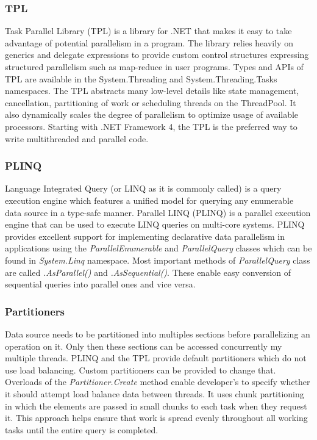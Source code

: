 \subsubsection{TPL}
\label{sec: TPL}
Task Parallel Library (TPL) is a library for .NET that
makes it easy to take advantage of potential parallelism in
a program. The library relies heavily on generics and delegate
expressions to provide custom control structures expressing
structured parallelism such as map-reduce in user
programs. Types and APIs of TPL are available in the System.Threading and System.Threading.Tasks namespaces.
The TPL abstracts many low-level details like state management, cancellation, partitioning of work or scheduling threads on the ThreadPool.
It also dynamically scales the degree of parallelism to optimize usage of available processors. Starting with .NET Framework 4, the TPL is the preferred way to write multithreaded and parallel code. \cite{Leijen2009}

\subsubsection{PLINQ}
\label{sec: PLINQ}
Language Integrated Query (or LINQ as it is commonly called) is a query execution engine which features a unified model for querying any enumerable data source in a type-safe manner. Parallel LINQ (PLINQ) is a parallel execution engine that can be used to execute LINQ queries on multi-core systems. PLINQ provides excellent support for implementing declarative data parallelism in applications using the \emph{ParallelEnumerable} and \emph{ParallelQuery} classes which can be found in \emph{System.Linq} namespace.
Most important methods of \emph{ParallelQuery} class are called \emph{.AsParallel()} and \emph{.AsSequential()}. These enable easy conversion of sequential queries into parallel ones and vice versa.

\subsubsection{Partitioners}
\label{sec: Partitioners}
Data source needs to be partitioned into multiples sections before parallelizing an operation on it. Only then these sections can be accessed concurrently my multiple threads. PLINQ and the TPL provide default partitioners which do not use load balancing. Custom partitioners can be provided to change that. Overloads of the \emph{Partitioner.Create} method
 enable developer's to specify whether it should attempt load balance data between threads. It uses chunk partitioning in which the elements are passed in small chunks to each task when they request it. This approach helps ensure that work is spread evenly throughout all working tasks until the entire query is completed. \cite{Partitioners}

